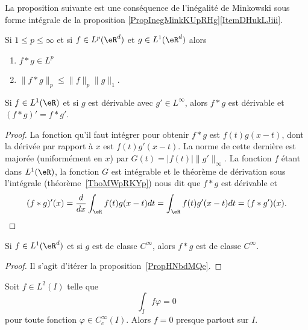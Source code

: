La proposition suivante est une conséquence de l'inégalité de Minkowski sous forme intégrale de la proposition \ref{PropInegMinkKUpRHg}\ref{ItemDHukLJiii}.
\begin{proposition}     \label{PROPooDMMCooPTuQuS}
    Si \( 1\leq p\leq \infty\) et si \( f\in L^p(\eR^d)\) et \( g\in L^1(\eR^d)\) alors
    \begin{enumerate}
        \item
            \( f*g\in L^p\)
        \item
            \( \| f*g \|_p\leq \| f \|_p\| g \|_1\).
    \end{enumerate}
\end{proposition}

\begin{proposition} \label{PropHNbdMQe}
    Si \( f\in L^1(\eR)\) et si \( g\) est dérivable avec \( g'\in L^{\infty}\), alors \( f*g\) est dérivable et \( (f*g)'=f*g'\).
\end{proposition}

\begin{proof}
    La fonction qu'il faut intégrer pour obtenir \( f*g\) est $f(t)g(x-t)$, dont la dérivée par rapport à \( x\) est \( f(t)g'(x-t)\). La norme de cette dernière est majorée (uniformément en \( x\)) par \( G(t)=| f(t) | \| g' \|_{\infty}\). La fonction \( f\) étant dans \( L^1(\eR)\), la fonction \( G\) est intégrable et le théorème de dérivation sous l'intégrale (théorème~\ref{ThoMWpRKYp}) nous dit que \( f*g\) est dérivable et
    \begin{equation}
        (f*g)'(x)=\frac{ d }{ dx }\int_{\eR}f(t)g(x-t)dt=\int_{\eR}f(t)g'(x-t)dt=(f*g')(x).
    \end{equation}
\end{proof}

\begin{corollary}       \label{CORooBSPNooFwYQrc}
    Si \( f\in L^1(\eR^d)\) et si \( g\) est de classe \(  C^{\infty}\), alors \( f*g\) est de classe \(  C^{\infty}\).
\end{corollary}

\begin{proof}
    Il s'agit d'itérer la proposition~\ref{PropHNbdMQe}.
\end{proof}

\begin{lemma}       \label{LemDQEKNNf}
    Soit \( f\in L^2(I)\) telle que
    \begin{equation}
        \int_If\varphi=0
    \end{equation}
    pour toute fonction \( \varphi\in C^{\infty}_c(I)\). Alors \( f=0\) presque partout sur \( I\).
\end{lemma}

